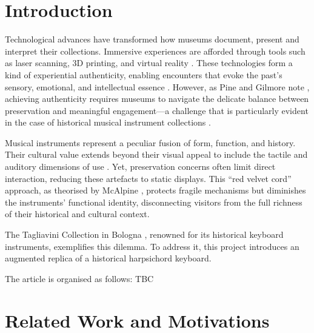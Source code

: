 \section{Introduction}\label{introduction}

Technological advances have transformed how museums document, present and interpret their collections. Immersive experiences are afforded through tools such as laser scanning, 3D printing, and virtual reality \cite{allard2005use,Wachowiak01082009,RCM_2024_3D,Kuzminsky_LaserScan_2012,Schaich_3D_2007}. These technologies form a kind of experiential authenticity, enabling encounters that evoke the past's sensory, emotional, and intellectual essence \cite{trant_Auth_1999}. However, as Pine and Gilmore note \cite{pinegilmore_2007}, achieving authenticity requires museums to navigate the delicate balance between preservation and meaningful engagement—a challenge that is particularly evident in the case of historical musical instrument collections \cite{McAlpine2014}.

Musical instruments represent a peculiar fusion of form, function, and history. Their cultural value extends beyond their visual appeal to include the tactile and auditory dimensions of use \cite{Fritz2017}. Yet, preservation concerns often limit direct interaction, reducing these artefacts to static displays. This ``red velvet cord'' approach, as theorised by McAlpine \cite{McAlpine2014}, protects fragile mechanisms but diminishes the instruments’ functional identity, disconnecting visitors from the full richness of their historical and cultural context.

The Tagliavini Collection in Bologna \cite{Tagliavini2007}, renowned for its historical keyboard instruments, exemplifies this dilemma. To address it, this project introduces an augmented replica of a historical harpsichord keyboard. 


The article is organised as follows: TBC



\section{Related Work and Motivations}\label{related-work}


